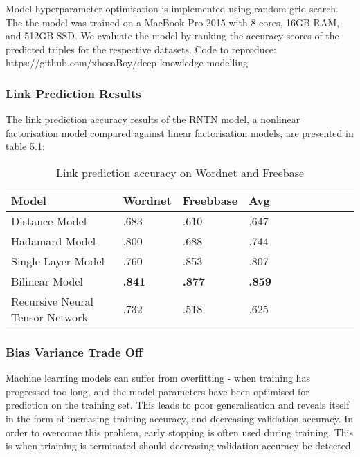Model hyperparameter optimisation is implemented using random grid search. The the model was trained on a MacBook Pro 2015 with 8 cores, 16GB RAM, and 512GB SSD. \newline
We evaluate the model by ranking the accuracy scores of the predicted triples for the respective datasets. Code to reproduce: https://github.com/xhosaBoy/deep-knowledge-modelling

\subsubsection{Link Prediction Results}
The link prediction accuracy results of the RNTN model, a nonlinear factorisation model compared against linear factorisation models, are presented in table 5.1:

\begin{table}[H]
\caption{Link prediction accuracy on Wordnet and Freebase}
\centering
\begin{tabular}{lllllllllll}
  \textbf{Model} & \textbf{Wordnet} & \textbf{Freebbase} & \textbf{Avg} \\
  \hline
  Distance Model & .683 & .610 & .647 \\
  Hadamard Model & .800 & .688 & .744 \\
  Single Layer Model & .760 & .853 & .807 \\
  Bilinear Model & \textbf{.841} & \textbf{.877} & \textbf{.859} \\
  Recursive Neural Tensor Network & .732 & .518 & .625 \\

\end{tabular}
\end{table}

\subsubsection{Bias Variance Trade Off}
Machine learning models can suffer from overfitting \cite{reference} - when training has progressed too long, and the model parameters have been optimised for prediction on the training set. This leads to poor generalisation  and reveals itself in the form of increasing training accuracy, and decreasing validation accuracy. In order to overcome this problem, early stopping is often used during training. This is when triaining is terminated should decreasing validation accuracy be detected.\newline

